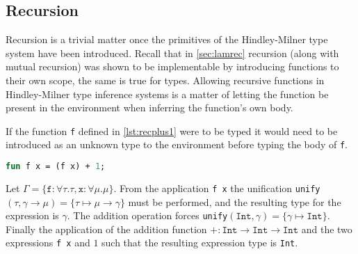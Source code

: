 \documentclass[11pt,oneside,a4paper]{report}
\begin{document}
\subsection{Recursion}
Recursion is a trivial matter once the primitives of the Hindley-Milner type system have been introduced.
Recall that in \autoref{sec:lamrec} recursion (along with mutual recursion) was shown to be implementable by introducing functions to their own scope, the same is true for types.
Allowing recursive functions in Hindley-Milner type inference systems is a matter of letting the function be present in the environment when inferring the function's own body.
\begin{exmp}
If the function \texttt{f} defined in \autoref{lst:recplus1} were to be typed it would need to be introduced as an unknown type to the environment before typing the body of \texttt{f}.
\begin{lstlisting}[language=ML,caption={Recursive function},label={lst:recplus1},mathescape=true]
fun f x = (f x) + 1;
\end{lstlisting}
Let $\Gamma = \{ \texttt{f} : \forall \tau . \tau, \texttt{x} : \forall \mu . \mu \}$.
From the application \texttt{f x} the unification \texttt{unify}$(\tau, \gamma \rightarrow \mu) = \{ \tau \mapsto \mu \rightarrow \gamma \}$ must be performed, and the resulting type for the expression is $\gamma$.
The addition operation forces \texttt{unify}$(\texttt{Int}, \gamma) = \{ \gamma \mapsto \texttt{Int} \}$.
Finally the application of the addition function $+: \texttt{Int} \rightarrow \texttt{Int} \rightarrow \texttt{Int}$ and the two expressions \texttt{f x} and $1$ such that the resulting expression type is \texttt{Int}.

\end{exmp}
\end{document}
